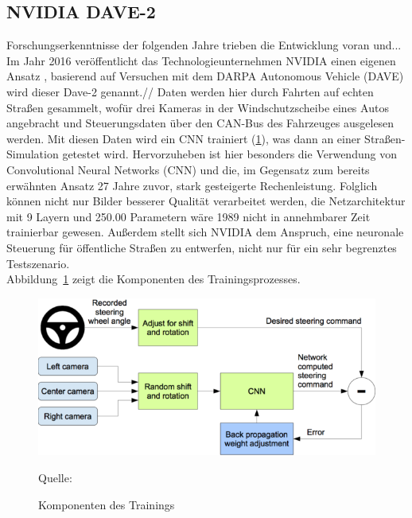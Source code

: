\subsection{NVIDIA DAVE-2}

Forschungserkenntnisse der folgenden Jahre trieben die Entwicklung voran und...
Im Jahr 2016 veröffentlicht das Technologieunternehmen \textsc{NVIDIA} einen eigenen Ansatz \cite{bojarski2016end}, basierend auf Versuchen mit dem \glqq DARPA Autonomous Vehicle \grqq{} (DAVE)  wird dieser \glqq Dave-2 \grqq{} genannt.//
Daten werden hier durch Fahrten auf echten Straßen gesammelt, wofür drei Kameras in der Windschutzscheibe eines Autos angebracht und Steuerungsdaten über den CAN-Bus des Fahrzeuges ausgelesen werden. Mit diesen Daten wird ein CNN trainiert (\ref{img:NVIDIA}), was dann an einer Straßen-Simulation getestet wird. Hervorzuheben ist hier besonders die Verwendung von Convolutional Neural Networks (CNN) und die, im Gegensatz zum bereits erwähnten Ansatz 27 Jahre zuvor, stark gesteigerte Rechenleistung. Folglich können nicht nur Bilder besserer Qualität verarbeitet werden, die Netzarchitektur mit 9 Layern und 250.00 Parametern wäre 1989 nicht in annehmbarer Zeit trainierbar gewesen. Außerdem stellt sich NVIDIA dem Anspruch, eine neuronale Steuerung für öffentliche Straßen zu entwerfen, nicht nur für ein sehr begrenztes Testszenario.\\

Abbildung~\ref{img:NVIDIA} zeigt die Komponenten des Trainingsprozesses. 

\begin{figure}[h]
	\centering
	\includegraphics[scale=0.6]{figures/NVIDIA-Training.png}
	\caption{Komponenten des Trainings}
	Quelle: 
	\label{img:NVIDIA}
\end{figure}





